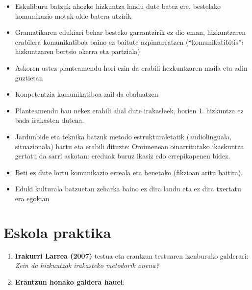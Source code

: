 \documentclass[
]{book}
\providecommand{\tightlist}{%
  \setlength{\itemsep}{0pt}\setlength{\parskip}{0pt}}
\begin{document}
\begin{itemize}
\item
  Eskuliburu batzuk ahozko hizkuntza landu dute batez ere, bestelako komunikazio motak alde batera utzirik
\item
  Gramatikaren edukiari behar besteko garrantzirik ez dio eman, hizkuntzaren erabilera komunikatiboa baino ez baitute azpimarratzen (``komunikatibitis'': hizkuntzaren bertsio okerra eta partziala)
\item
  Askoren ustez planteamendu hori ezin da erabili hezkuntzaren maila eta adin guztietan
\item
  Konpetentzia komunikatiboa zail da ebaluatzen
\item
  Planteamendu hau nekez erabili ahal dute irakasleek, horien 1. hizkuntza ez bada irakasten dutena.
\item
  Jardunbide eta teknika batzuk metodo estrukturaletatik (audiolinguala, situazionala) hartu eta erabili dituzte: Oroimenean oinarritutako ikaskuntza gertatu da sarri askotan: ereduak buruz ikasiz edo errepikapenen bidez.
\item
  Beti ez dute lortu komunikazio erreala eta benetako (fikzioan aritu baitira).
\item
  Eduki kulturala batzuetan zeharka baino ez dira landu eta ez dira txertatu era egokian
\end{itemize}

\hypertarget{eskola-praktika}{%
\section{Eskola praktika}\label{eskola-praktika}}

\begin{enumerate}
\def\labelenumi{\alph{enumi}.}
\tightlist
\item
  \textbf{Irakurri Larrea (2007)} testua eta erantzun testuaren izenburuko galderari: \emph{Zein da hizkuntzak irakasteko metodorik onena?}
\item
  \textbf{Erantzun honako galdera hauei}:
\end{enumerate}
\end{document}
